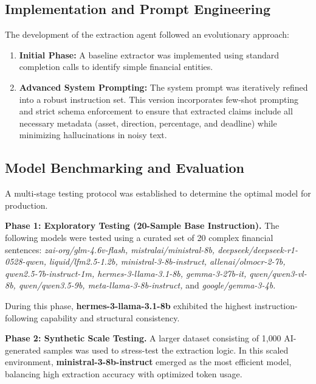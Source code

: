 \documentclass[a4paper,12pt]{report}
\begin{document}
\subsection{Implementation and Prompt Engineering}

The development of the extraction agent followed an evolutionary approach:
\begin{enumerate}
    \item \textbf{Initial Phase:} A baseline extractor was implemented using standard completion calls to identify simple financial entities.
    \item \textbf{Advanced System Prompting:} The system prompt was iteratively refined into a robust instruction set. This version incorporates few-shot prompting and strict schema enforcement to ensure that extracted claims include all necessary metadata (asset, direction, percentage, and deadline) while minimizing hallucinations in noisy text.
\end{enumerate}

\subsection{Model Benchmarking and Evaluation}

A multi-stage testing protocol was established to determine the optimal model for production.

\begin{sloppypar}
\textbf{Phase 1: Exploratory Testing (20-Sample Base Instruction).}
The following models were tested using a curated set of 20 complex financial sentences:
\textit{zai-org/glm-4.6v-flash, mistralai/ministral-8b, deepseek/deepseek-r1-0528-qwen, liquid/lfm2.5-1.2b, ministral-3-8b-instruct, allenai/olmocr-2-7b, qwen2.5-7b-instruct-1m, hermes-3-llama-3.1-8b, gemma-3-27b-it, qwen/qwen3-vl-8b, qwen/qwen3.5-9b, meta-llama-3-8b-instruct,} and \textit{google/gemma-3-4b.}
\end{sloppypar}

\begin{sloppypar}
During this phase, \textbf{hermes-3-llama-3.1-8b} exhibited the highest instruction-following capability and structural consistency.
\end{sloppypar}

\textbf{Phase 2: Synthetic Scale Testing.}
A larger dataset consisting of 1{,}000 AI-generated samples was used to stress-test the extraction logic. In this scaled environment, \textbf{ministral-3-8b-instruct} emerged as the most efficient model, balancing high extraction accuracy with optimized token usage.
\end{document}
